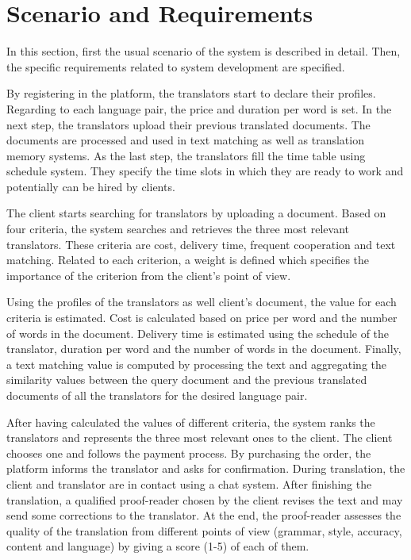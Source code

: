 \section{Scenario and Requirements}
\label{sec:scenario}
In this section, first the usual scenario of the system is described in detail. Then, the specific requirements related to system development are specified.

By registering in the platform, the translators start to declare their profiles. Regarding to each language pair, the price and duration per word is set. In the next step, the translators upload their previous translated documents. The documents are processed and used in text matching as well as  translation memory systems. As the last step, the translators fill the time table using schedule system. They specify the time slots in which they are ready to work and potentially can be hired by clients.

The client starts searching for translators by uploading a document. Based on four criteria, the system searches and retrieves the three most relevant translators. These criteria are cost, delivery time, frequent cooperation and text matching. Related to each criterion, a weight is defined which specifies the importance of the criterion from the client's point of view.

Using the profiles of the translators as well client's document, the value for each criteria is estimated. Cost is calculated based on price per word and the number of words in the document. Delivery time is estimated using the schedule of the translator, duration per word and the number of words in the document. Finally, a text matching value is computed by processing the text and aggregating the similarity values between the query document and the previous translated documents of all the translators for the desired language pair.

After having calculated the values of different criteria, the system ranks the translators and represents the three most relevant ones to the client. The client chooses one and follows the payment process. By purchasing the order, the platform informs the translator and asks for confirmation. During translation, the client and translator are in contact using a chat system. After finishing the translation, a qualified proof-reader chosen by the client revises the text and may send some corrections to the translator. At the end, the proof-reader assesses the quality of the translation from different points of view (grammar, style, accuracy, content and language) by giving a score (1-5) of each of them.

